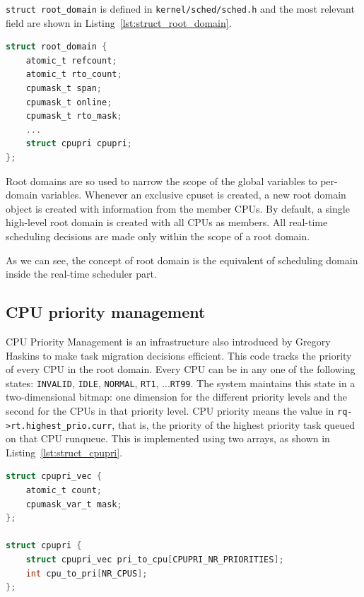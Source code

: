 \texttt{struct root\_domain} is defined in
\texttt{kernel/sched/sched.h} and the most relevant field are shown in
Listing~\ref{lst:struct_root_domain}.

\begin{lstlisting}[language=C, caption={\texttt{struct root\_domain}},
                        label={lst:struct_root_domain}]
struct root_domain {
	atomic_t refcount;
	atomic_t rto_count;
	cpumask_t span;
	cpumask_t online;
	cpumask_t rto_mask;
	...
	struct cpupri cpupri;
};
\end{lstlisting}

Root domains are so used to narrow the scope of the global variables
to per-domain variables. Whenever an exclusive cpuset is created, a
new root domain object is created with information from the member
CPUs. By default, a single high-level root domain is created with all
CPUs as members. All real-time scheduling decisions are made only
within the scope of a root domain.

As we can see, the concept of root domain is the equivalent of
scheduling domain inside the real-time scheduler part.

\subsection{CPU priority management\label{sec:cpu_prio_manag}}

CPU Priority Management is an infrastructure also introduced by
Gregory Haskins to make task migration decisions efficient. This code
tracks the priority of every CPU in the root domain. Every CPU can be
in any one of the following states: \texttt{INVALID}, \texttt{IDLE},
\texttt{NORMAL}, \texttt{RT1}, ...\texttt{RT99}.  The system maintains
this state in a two-dimensional bitmap: one dimension for the
different priority levels and the second for the CPUs in that priority
level. CPU priority means the value in
\texttt{rq->rt.highest\_prio.curr}, that is, the priority of the
highest priority task queued on that CPU runqueue. This is implemented
using two arrays, as shown in Listing~\ref{lst:struct_cpupri}.

\begin{lstlisting}[language=C, caption={\texttt{struct cpupri}},
                        label={lst:struct_cpupri}]
struct cpupri_vec {
	atomic_t count;
	cpumask_var_t mask;
};

struct cpupri {
	struct cpupri_vec pri_to_cpu[CPUPRI_NR_PRIORITIES];
	int cpu_to_pri[NR_CPUS];
};
\end{lstlisting}

